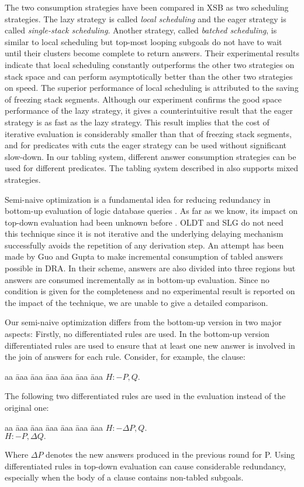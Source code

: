 \documentclass{tlp}
\begin{document}
The two consumption strategies have been compared in XSB \cite{Freire98} as two scheduling strategies. The lazy strategy is called {\it local scheduling} and the eager strategy is called {\it single-stack scheduling}. Another strategy, called {\it batched scheduling}, is similar to local scheduling but top-most looping subgoals do not have to wait until their clusters become complete to return answers. Their experimental results indicate that local scheduling constantly outperforms the other two strategies on stack space and can perform asymptotically better than the other two strategies on speed. The superior performance of local scheduling is attributed to the saving of freezing stack segments. Although our experiment confirms the good space performance of the lazy strategy, it gives a counterintuitive result that the eager strategy is as fast as the lazy strategy. This result implies that the cost of iterative evaluation is considerably smaller than that of freezing stack segments, and for predicates with cuts the eager strategy can be used without significant slow-down. In our tabling system, different answer consumption strategies can be used for different predicates. The tabling system described in \cite{Rocha05} also supports mixed strategies.

Semi-naive optimization is a fundamental idea for reducing redundancy in bottom-up evaluation of logic database queries \cite{Banc86,Ullman88}. As far as we know, its impact on top-down evaluation had been unknown before \cite{Zhou04}. OLDT \cite{Tamaki86} and SLG \cite{Sagonas98} do not need this technique since it is not iterative and the underlying delaying mechanism successfully avoids the repetition of any derivation step. An attempt has been made by Guo and Gupta \cite{Guo01} to make incremental consumption of tabled answers possible in DRA. In their scheme, answers are also divided into three regions but answers are consumed incrementally as in bottom-up evaluation. Since no condition is given for the completeness and no experimental result is reported on the impact of the technique, we are unable to give a detailed comparison.

Our semi-naive optimization differs from the bottom-up version in two major aspects: Firstly, no differentiated rules are used. In the bottom-up version differentiated rules are used to ensure that at least one new answer is involved in the join of answers for each rule. Consider, for example, the clause:
\begin{tabbing}
aa \= aaa \= aaa \= aaa \= aaa \= aaa \= aaa \kill
\> $H:-P,Q.$
\end{tabbing}
The following two differentiated rules are used in the evaluation instead of the original one:
\begin{tabbing}
aa \= aaa \= aaa \= aaa \= aaa \= aaa \= aaa \kill
\> $H:-\Delta P,Q.$ \\
\> $H:-P,\Delta Q.$
\end{tabbing}
Where $\Delta P$ denotes the new answers produced in the previous round for P. Using differentiated rules in top-down evaluation can cause considerable redundancy, especially when the body of a clause contains non-tabled subgoals.
\end{document}
